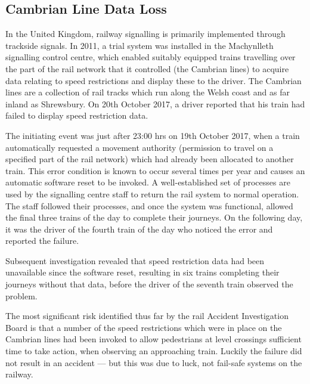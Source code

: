 \subsection{Cambrian Line Data Loss} \label{bkm:incacc:cambrian}

In the United Kingdom, railway signalling is primarily implemented through trackside signals. In 2011, a trial system was installed in the Machynlleth signalling control centre, which enabled suitably equipped trains travelling over the part of the rail network that it controlled (the Cambrian lines) to acquire data relating to speed restrictions and display these to the driver. The Cambrian lines are a collection of rail tracks which run along the Welsh coast and as far inland as Shrewsbury. On 20th October 2017, a driver reported that his train had failed to display speed restriction data.

The initiating event was just after 23:00 hrs on 19th October 2017, when a train automatically requested a movement authority (permission to travel on a specified part of the rail network) which had already been allocated to another train. This error condition is known to occur several times per year and causes an automatic software reset to be invoked. A well-established set of processes are used by the signalling centre staff to return the rail system to normal operation. The staff followed their processes, and once the system was functional, allowed the final three trains of the day to complete their journeys. On the following day, it was the driver of the fourth train of the day who noticed the error and reported the failure.

Subsequent investigation revealed that speed restriction data had been unavailable since the software reset, resulting in six trains completing their journeys without that data, before the driver of the seventh train observed the problem. 

The most significant risk identified thus far by the rail Accident Investigation Board is that a number of the speed restrictions which were in place on the Cambrian lines had been invoked to allow pedestrians at level crossings sufficient time to take action, when observing an approaching train. Luckily the failure did not result in an accident --- but this was due to luck, not fail-safe systems on the railway.

